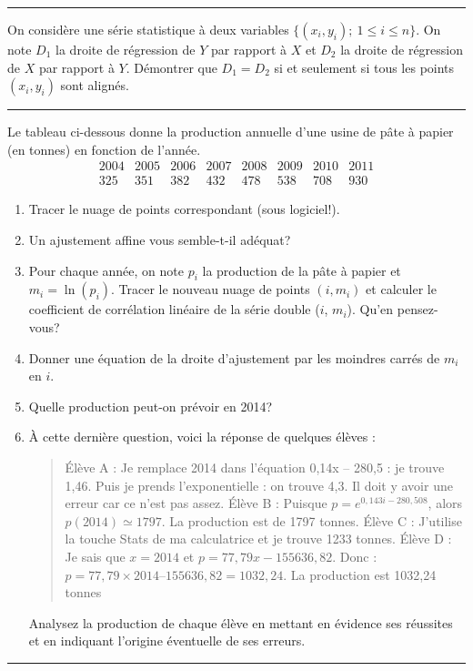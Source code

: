\documentclass[../PolyS4.tex]{subfiles}
\begin{document}
\vspace{1em}
\hrule
\vspace{1em}


On considère une série statistique à deux variables $\{(x_i,y_i);\ 1\leq i\leq n\}$. On note $D_1$ la droite de régression de $Y$ par rapport à $X$ et $D_2$ la droite de régression de $X$ par rapport à $Y$. Démontrer que $D_1=D_2$ si et seulement si tous les points $(x_i,y_i)$ sont alignés.

\vspace{1em}
\hrule
\vspace{1em}


Le tableau ci-dessous donne la production annuelle d'une usine de pâte à papier (en tonnes) en fonction de l'année. 
$$
\begin{array}{|c|c|c|c|c|c|c|c|}
2004&2005&2006&2007&2008&2009&2010&2011\\
\hline
325&351&382&432&478&538&708&930
\end{array}
$$

\begin{enumerate}
\item Tracer le nuage de points correspondant (sous logiciel!).
\item Un ajustement affine vous semble-t-il adéquat?
\item Pour chaque année, on note $p_i$ la production de la pâte à papier et $m_i=\ln(p_i)$. Tracer le nouveau nuage de points $(i,m_i)$ et calculer le coefficient de corrélation linéaire de la série double ($i$, $m_i$). Qu'en pensez-vous?
\item Donner une équation de la droite d'ajustement par les moindres carrés de $m_i$ en $i$.
\item Quelle production peut-on prévoir en 2014?
\item À cette dernière question, voici la réponse de quelques élèves :
\begin{quote}
Élève A : Je remplace 2014 dans l'équation 0,14x – 280,5 : je trouve 1,46. Puis je prends
l'exponentielle : on trouve 4,3. Il doit y avoir une erreur car ce n'est pas assez.\newline
Élève B : Puisque $p = e^{0,143i -280,508}$, alors $p(2014)\simeq 1797$. La production est de 1797 tonnes.\newline
Élève C : J'utilise la touche Stats de ma calculatrice et je trouve 1233 tonnes.\newline
Élève D : Je sais que $x= 2014$ et $p = 77,79x -155 636,82$.
Donc : $p = 77,79\times 2014 – 155 636,82 =1032,24$. La production est 1032,24 tonnes
\end{quote}
Analysez la production de chaque élève en mettant en évidence ses réussites et en indiquant l'origine éventuelle de ses erreurs.
\end{enumerate}

\vspace{1em}
\hrule
\vspace{1em}
\end{document}
